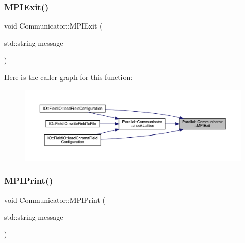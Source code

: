 \subsubsection{\texorpdfstring{MPIExit()}{MPIExit()}}
{\footnotesize\ttfamily void Communicator\+::\+M\+P\+I\+Exit (\begin{DoxyParamCaption}\item[{std\+::string}]{message }\end{DoxyParamCaption})\hspace{0.3cm}{\ttfamily [static]}}

Here is the caller graph for this function\+:
\nopagebreak
\begin{figure}[H]
\begin{center}
\leavevmode
\includegraphics[width=350pt]{class_parallel_1_1_communicator_a57bb28ee8dbc4efd708a2695423778c4_icgraph}
\end{center}
\end{figure}
\mbox{\label{class_parallel_1_1_communicator_a34a1d27c0e2b2b101b97a53734dbc4f8}} 
\subsubsection{\texorpdfstring{MPIPrint()}{MPIPrint()}}
{\footnotesize\ttfamily void Communicator\+::\+M\+P\+I\+Print (\begin{DoxyParamCaption}\item[{std\+::string}]{message }\end{DoxyParamCaption})\hspace{0.3cm}{\ttfamily [static]}}

\mbox{\label{class_parallel_1_1_communicator_a5d42989e7a3022de6042e3503aa35346}} 
